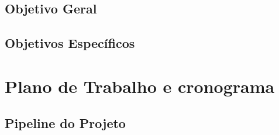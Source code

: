 \documentclass[12pt]{article}
\begin{document}
\subsection{Objetivo Geral}

\subsection{Objetivos Específicos}

\section{Plano de Trabalho e cronograma}
\subsection{Pipeline do Projeto}
\end{document}
